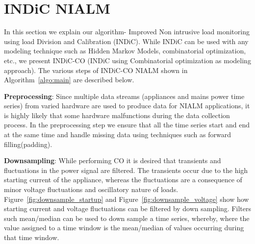 \documentclass[conference]{IEEEtran}
\newcommand{\figref}[1]{Figure~\ref{#1}}
\newcommand{\algoref}[1]{Algorithm~\ref{#1}}
\begin{document}
\section{INDiC NIALM}
In this section we explain our algorithm- Improved Non intrusive load monitoring using load Division and Calibration (INDiC). While INDiC can be used with any modeling technique such as Hidden Markov Models\cite{rabiner}, combinatorial optimization, etc., we present INDiC-CO (INDiC using Combinatorial optimization as modeling approach). The various steps of INDiC-CO NIALM shown in \algoref{algo:main} are described below. 

\textbf{Preprocessing}: Since multiple data streams (appliances and mains power time series) from varied hardware are used to produce data for NIALM applications, it is highly likely that some hardware malfunctions during the data collection process. In the preprocessing step we ensure that all the time series start and end at the same time and handle missing data using techniques such as forward filling(padding).

\textbf{Downsampling}: While performing CO it is desired that transients and fluctuations in the power signal are filtered\cite{hart}. The transients occur due to the high starting current of the appliance, whereas the fluctuations are a consequence of minor voltage fluctuations and oscillatory nature of loads. \figref{fig:downsample_startup} and \figref{fig:downsample_voltage} show how starting current and voltage fluctuations can be filtered by down sampling. Filters such mean/median can be used to down sample a time series, whereby, where the value assigned to a time window is the mean/median of values occurring during that time window.
\end{document}
